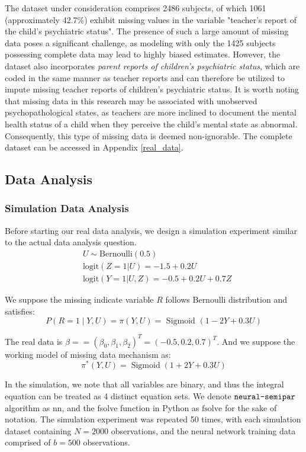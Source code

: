 \documentclass[11pt]{article}
\def\neurosemi{{\normalfont\texttt{neural-semipar}}}
\begin{document}
The dataset under consideration comprises 2486 subjects, of which 1061 (approximately 42.7\%) exhibit missing values in the variable "teacher's report of the child's psychiatric status". The presence of such a large amount of missing data poses a significant challenge, as modeling with only the 1425 subjects possessing complete data may lead to highly biased estimates. However, the dataset also incorporates \textit{parent reports of children's psychiatric status}, which are coded in the same manner as teacher reports and can therefore be utilized to impute missing teacher reports of children's psychiatric status. It is worth noting that missing data in this research may be associated with unobserved psychopathological states, as teachers are more inclined to document the mental health status of a child when they perceive the child's mental state as abnormal. Consequently, this type of missing data is deemed non-ignorable. The complete dataset can be accessed in Appendix \ref{real_data}.

\subsection{Data Analysis}

\subsubsection{Simulation Data Analysis}

Before starting our real data analysis, we design a simulation experiment similar to the actual data analysis question.
\begin{equation}
\label{model-sens-simu}
\begin{split}
& U \sim \text{Bernoulli} (0.5) \\
& \text{logit} \left( Z = 1 | U \right) = -1.5 + 0.2 U \\
& \text{logit} \left( Y = 1 | U, Z \right) = -0.5 + 0.2 U + 0.7 Z
\end{split}
\end{equation}

We suppose the missing indicate variable $R$ follows Bernoulli distribution and satisfies:
$$
P(R=1 \mid Y, U)=\pi(Y, U)=\text { Sigmoid }(1-2 Y+0.3 U)
$$

The real data is $\beta==\left(\beta_0, \beta_1, \beta_2\right)^T=(-0.5,0.2,0.7)^T$. And we suppose the working model of missing data mechanism as:
$$
\pi^*(Y, U)=\operatorname{Sigmoid}(1+2 Y+0.3 U)
$$

In the simulation, we note that all variables are binary, and thus the integral equation can be treated as 4 distinct equation sets. We denote $\neurosemi$ algorithm as $\text{nn}$, and the fsolve function in Python as $\text{fsolve}$ for the sake of notation. The simulation experiment was repeated 50 times, with each simulation dataset containing $N= 2000$ observations, and the neural network training data comprised of $b=500$ observations.
\end{document}
